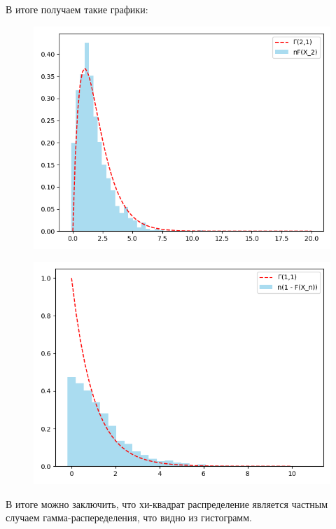 \documentclass{article}
\begin{document}
В итоге получаем такие графики:

\begin{figure}[H]
      \centering
      \includegraphics[width=0.5\linewidth]{Python/second-two-one.png}
\end{figure}
\begin{figure}[H]
      \centering
      \includegraphics[width=0.5\linewidth]{Python/second-one-one.png}
\end{figure}

В итоге можно заключить, что хи-квадрат распределение является частным случаем гамма-распеределения, что видно из гистограмм.
\end{document}
